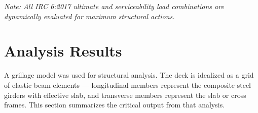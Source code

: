 \documentclass[12pt,a4paper]{report}
\numberwithin{table}{chapter}
\numberwithin{figure}{chapter}
\renewcommand{\arraystretch}{1.15}
\begin{document}
\noindent\textit{Note: All IRC 6:2017 ultimate and serviceability load combinations are dynamically evaluated for maximum structural actions.}


\chapter{Analysis Results}

A grillage model was used for structural analysis. The deck is idealized as a grid of elastic beam elements --- longitudinal members represent the composite steel girders with effective slab, and transverse members represent the slab or cross frames. This section summarizes the critical output from that analysis.

\vspace{1em}
\begingroup
\footnotesize
\setlength{\tabcolsep}{3pt}
\renewcommand{\arraystretch}{1.25}
\end{document}
